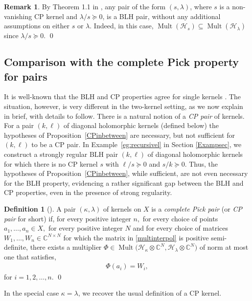 \documentclass[a4paper,reqno,index]{amsart}
\newcommand{\df}[1]{{\textit{#1}}{\index{#1}}}
\numberwithin{equation}{section}
\newcommand{\Mult}{\operatorname{Mult}}
\newcommand{\cH}{\mathcal{H}}
\newcommand{\genk}{\kappa} %
\newcommand{\genl}{\lambda} %
\theoremstyle{definition}
\newtheorem{definition}[theorem]{Definition}
\newtheorem{remark}[theorem]{Remark}
\begin{document}
\begin{remark}
By Theorem 1.1 in \cite{Beurlingfactor}, 
 any pair of the form $(s, \genl)$, where $s$ is a non-vanishing CP kernel and $\genl/s\succeq 0$, is a BLH pair, without any additional assumptions on either $s$ or $\genl$.    Indeed,
 in this case, $\Mult(\cH_s)\subseteq \Mult(\cH_\lambda)$
 since $\lambda/s\succeq 0.$
\qed\end{remark}


\subsection{Comparison with the complete Pick property for pairs} \label{CPsubsec}
It is well-known that the BLH and CP properties agree for single kernels \cite{mcctrent}. The situation, however, is very different in the two-kernel setting, as we now explain in brief, with details to follow.  There is a natural
notion of a \textit{CP pair} of kernels.  For a pair $(k,\ell)$ of diagonal holomorphic kernels (defined below) 
the hypotheses of Proposition~\ref{CPinbetween} are necessary, but not sufficient for $(k,\ell)$ to be a CP pair.
In Example~\ref{eg:recursivel} in Section \ref{Exampsec}, we  construct  a strongly regular BLH pair $(k, \ell)$   of diagonal holomorphic kernels for which    there is no CP kernel $s$ with $\ell/s\succeq 0$ and $s/k\succeq 0$. Thus, the hypotheses of Proposition~\ref{CPinbetween},   while sufficient,   are not even necessary for the BLH property, evidencing a rather significant gap between the BLH and CP properties, even in the presence of strong regularity. 

\begin{definition}[\cite{Shimorin}] \label{CPdef}
A pair $(\genk, \genl)$ of kernels on  $X$ is a \df{complete Pick pair} (or \df{CP pair} for short)  if, for every positive integer $n,$ for every choice of points $a_1, \dots, a_n\in X,$ for every positive integer $N$ and for every choice of  matrices $W_1, \dots, W_n\in\mathbb{C}^{N\times N}$  for  which  the matrix in \eqref{multinterpol} is positive semi-definite, there exists a multiplier $\Phi \in\Mult\big(\mathcal{H}_{\genk}\otimes\mathbb{C}^N, \mathcal{H}_{\genl}\otimes \mathbb{C}^N\big)$ of norm at most one that satisfies, 
 \begin{align*}
  \Phi(a_i)=W_i,
\end{align*}
for $i=1,2,\dots,n.$ 
\qed
\end{definition} 

In the special case $\genk=\genl$, we recover the usual definition of a CP kernel.
\end{document}
